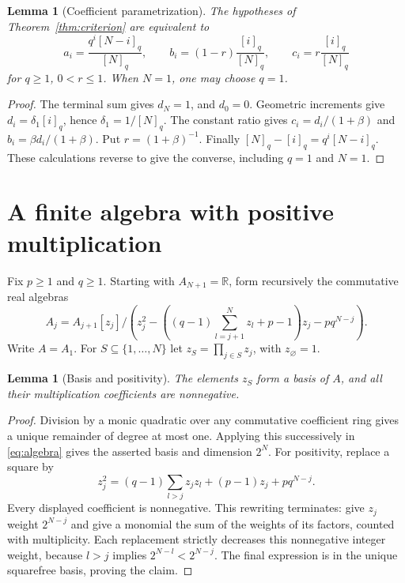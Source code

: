 \documentclass[11pt]{article}
\newtheorem{lemma}[theorem]{Lemma}
\begin{document}
\begin{lemma}[Coefficient parametrization]\label{lem:parameters}
The hypotheses of Theorem~\ref{thm:criterion} are equivalent to
\begin{equation}\label{eq:parameters}
a_i=\frac{q^i[N-i]_q}{[N]_q},\qquad
b_i=(1-r)\frac{[i]_q}{[N]_q},\qquad
c_i=r\frac{[i]_q}{[N]_q}
\end{equation}
for $q\geq1$, $0<r\leq1$. When $N=1$, one may choose $q=1$.
\end{lemma}
\begin{proof}
The terminal sum gives $d_N=1$, and $d_0=0$. Geometric increments give $d_i=\delta_1[i]_q$, hence $\delta_1=1/[N]_q$. The constant ratio gives $c_i=d_i/(1+\beta)$ and $b_i=\beta d_i/(1+\beta)$. Put $r=(1+\beta)^{-1}$. Finally $[N]_q-[i]_q=q^i[N-i]_q$. These calculations reverse to give the converse, including $q=1$ and $N=1$.
\end{proof}

\section{A finite algebra with positive multiplication}
Fix $p\geq1$ and $q\geq1$. Starting with $A_{N+1}=\mathbb R$, form recursively the commutative real algebras
\begin{equation}\label{eq:algebra}
A_j=A_{j+1}[z_j]\big/
\left(z_j^2-\left((q-1)\sum_{l=j+1}^N z_l+p-1\right)z_j-pq^{N-j}\right).
\end{equation}
Write $A=A_1$. For $S\subseteq\{1,\ldots,N\}$ let $z_S=\prod_{j\in S}z_j$, with $z_\varnothing=1$.

\begin{lemma}[Basis and positivity]\label{lem:basis}
The elements $z_S$ form a basis of $A$, and all their multiplication coefficients are nonnegative.
\end{lemma}
\begin{proof}
Division by a monic quadratic over any commutative coefficient ring gives a unique remainder of degree at most one. Applying this successively in \eqref{eq:algebra} gives the asserted basis and dimension $2^N$.
For positivity, replace a square by
\[
z_j^2=(q-1)\sum_{l>j}z_jz_l+(p-1)z_j+pq^{N-j}.
\]
Every displayed coefficient is nonnegative. This rewriting terminates: give $z_j$ weight $2^{N-j}$ and give a monomial the sum of the weights of its factors, counted with multiplicity. Each replacement strictly decreases this nonnegative integer weight, because $l>j$ implies $2^{N-l}<2^{N-j}$. The final expression is in the unique squarefree basis, proving the claim.
\end{proof}
\end{document}
